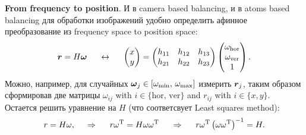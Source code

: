 \textbf{From frequency to position}. И в camera based balancing, и в atoms based balancing для обработки изображений удобно определить афинное преобразование из frequency space to position space:
\begin{equation*}
	\boldsymbol{r} = H \boldsymbol{\omega}
	\hspace{5 mm} \leftrightarrow \hspace{5 mm} 
	\begin{pmatrix}
		x \\ y
	\end{pmatrix} = \begin{pmatrix}
		h_{11} & h_{12} & h_{13} \\
		h_{21} & h_{22} & h_{23} \\
	\end{pmatrix} 
	\begin{pmatrix}
		\omega_{\textnormal{hor}} \\
		\omega_{\textnormal{ver}} \\
		1
	\end{pmatrix}.
\end{equation*}
Можно, например, для случайных $\boldsymbol{\omega}_j \in [\omega_{\textnormal{min}},\, \omega_{\textnormal{max}}]$ измерить $\boldsymbol{r}_j$, таким образом сформировав две матрицы $\omega_{ij}$ with $i \in \{\mathrm{hor},\, \mathrm{ver}\}$ and $r_{ij}$ with $i \in \{x, y\}$. Остается решить уравнение на $H$ (что соответсвует Least squares method):
\begin{equation}
	r = H \omega,
	\hspace{0.5cm} \Rightarrow \hspace{0.5cm}
	r \omega^{\textnormal{T}} = H \omega \omega^{\textnormal{T}}
	\hspace{0.5cm} \Rightarrow \hspace{0.5cm}
	r \omega^{\textnormal{T}} \left(\omega \omega^{\textnormal{T}}\right)^{-1} = H.
	\label{LinReg:freq2pos}
\end{equation}